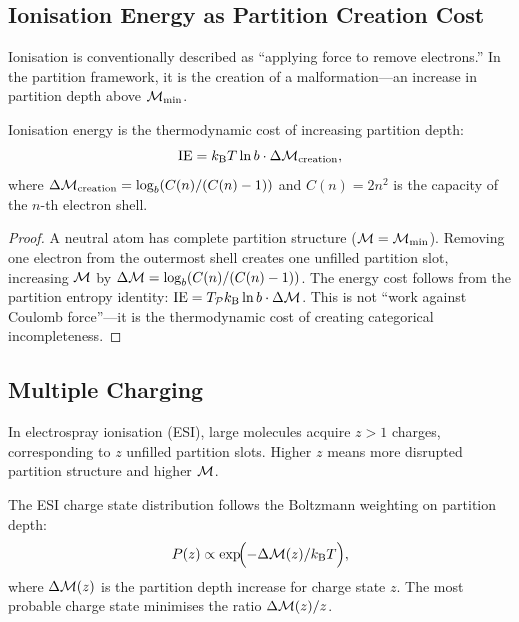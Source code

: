 \subsection{Ionisation Energy as Partition Creation Cost}

Ionisation is conventionally described as ``applying force to remove electrons.''
In the partition framework, it is the creation of a malformation---an increase
in partition depth above $\mathcal{M}_{\min}$.

\begin{theorem}
\label{thm:ch21-ionisation}
  Ionisation energy is the thermodynamic cost of increasing partition depth:
  \begin{equation}\label{eq:ch21-ie}
    \mathrm{IE} = k_{\mathrm{B}} T\ln b\cdot\Delta\mathcal{M}_{\mathrm{creation}},
  \end{equation}
  where $\Delta\mathcal{M}_{\mathrm{creation}} = \log_b(C(n)/(C(n)-1))$ and
  $C(n) = 2n^2$ is the capacity of the $n$-th electron shell.
\end{theorem}

\begin{proof}
  A neutral atom has complete partition structure ($\mathcal{M} = \mathcal{M}_{\min}$).
  Removing one electron from the outermost shell creates one unfilled partition
  slot, increasing $\mathcal{M}$ by $\Delta\mathcal{M} = \log_b(C(n)/(C(n)-1))$.  The
  energy cost follows from the partition entropy identity:
  $\mathrm{IE} = T_{\mathcal{P}}k_{\mathrm{B}}\ln b\cdot\Delta\mathcal{M}$.  This is not
  ``work against Coulomb force''---it is the thermodynamic cost of creating
  categorical incompleteness.
\end{proof}

\subsection{Multiple Charging}

In electrospray ionisation (ESI), large molecules acquire $z > 1$ charges,
corresponding to $z$ unfilled partition slots.  Higher $z$ means more disrupted
partition structure and higher $\mathcal{M}$.

\begin{theorem}
\label{thm:ch21-csd}
  The ESI charge state distribution follows the Boltzmann weighting on
  partition depth:
  \begin{equation}\label{eq:ch21-csd}
    P(z) \propto \exp\!\Bigl(-\Delta\mathcal{M}(z)/k_{\mathrm{B}} T\Bigr),
  \end{equation}
  where $\Delta\mathcal{M}(z)$ is the partition depth increase for charge state $z$.
  The most probable charge state minimises the ratio $\Delta\mathcal{M}(z) / z$.
\end{theorem}

